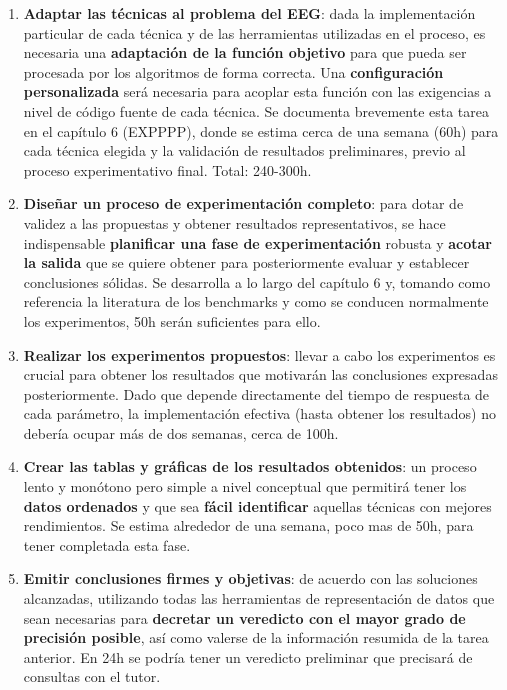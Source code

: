 \begin{enumerate}
	\item \label{tare5} \textbf{Adaptar las técnicas al problema del EEG}: dada la implementación particular de cada técnica y de las herramientas utilizadas en el proceso, es necesaria una \textbf{adaptación de la función objetivo} para que pueda ser procesada por los algoritmos de forma correcta. Una \textbf{configuración personalizada} será necesaria para acoplar esta función con las exigencias a nivel de código fuente de cada técnica. Se documenta brevemente esta tarea en el capítulo 6 (EXPPPP), donde se estima cerca de una semana (60h) para cada técnica elegida y la validación de resultados preliminares, previo al proceso experimentativo final. Total: 240-300h.
	
	\item  \label{tarea6}\textbf{Diseñar un proceso de experimentación completo}: para dotar de validez a las propuestas y obtener resultados representativos, se hace indispensable \textbf{planificar una fase de experimentación} robusta y \textbf{acotar la salida} que se quiere obtener para posteriormente evaluar y establecer conclusiones sólidas. Se desarrolla a lo largo del capítulo 6 y, tomando como referencia la literatura de los benchmarks y como se conducen normalmente los experimentos, 50h serán suficientes para ello.
	
	\item \label{tarea7} \textbf{Realizar los experimentos propuestos}: llevar a cabo los experimentos es crucial para obtener los resultados que motivarán las conclusiones expresadas posteriormente. Dado que depende directamente del tiempo de respuesta de cada parámetro, la implementación efectiva (hasta obtener los resultados) no debería ocupar más de dos semanas, cerca de 100h.
	
	\item  \label{tarea8} \textbf{Crear las tablas y gráficas de los resultados obtenidos}: un proceso lento y monótono pero simple a nivel conceptual que permitirá tener los \textbf{datos ordenados} y que sea \textbf{fácil identificar} aquellas técnicas con mejores rendimientos. Se estima alrededor de una semana, poco mas de 50h, para tener completada esta fase.
	
	\item \label{tarea9} \textbf{Emitir conclusiones firmes y objetivas}: de acuerdo con las soluciones alcanzadas, utilizando todas las herramientas de representación de datos que sean necesarias para \textbf{decretar un veredicto con el mayor grado de precisión posible}, así como valerse de la información resumida de la tarea anterior. En 24h se podría tener un veredicto preliminar que precisará de consultas con el tutor.
	

\end{enumerate}
